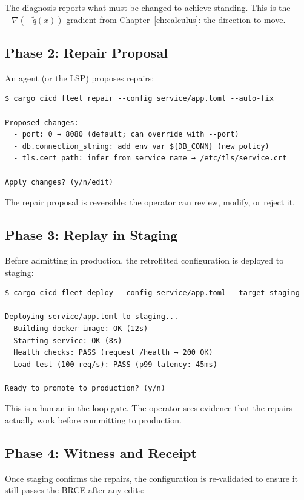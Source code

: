 The diagnosis reports what must be changed to achieve standing. This is the $-\nabla(-\tilde{q}(x))$ gradient from Chapter~\ref{ch:calculus}: the direction to move.

\subsection{Phase 2: Repair Proposal}

An agent (or the LSP) proposes repairs:

\begin{lstlisting}[caption={Repair phase: propose changes}]
$ cargo cicd fleet repair --config service/app.toml --auto-fix

Proposed changes:
  - port: 0 → 8080 (default; can override with --port)
  - db.connection_string: add env var ${DB_CONN} (new policy)
  - tls.cert_path: infer from service name → /etc/tls/service.crt

Apply changes? (y/n/edit)
\end{lstlisting}

The repair proposal is reversible: the operator can review, modify, or reject it.

\subsection{Phase 3: Replay in Staging}

Before admitting in production, the retrofitted configuration is deployed to staging:

\begin{lstlisting}[caption={Staging validation: verify repairs work}]
$ cargo cicd fleet deploy --config service/app.toml --target staging

Deploying service/app.toml to staging...
  Building docker image: OK (12s)
  Starting service: OK (8s)
  Health checks: PASS (request /health → 200 OK)
  Load test (100 req/s): PASS (p99 latency: 45ms)

Ready to promote to production? (y/n)
\end{lstlisting}

This is a human-in-the-loop gate. The operator sees evidence that the repairs actually work before committing to production.

\subsection{Phase 4: Witness and Receipt}

Once staging confirms the repairs, the configuration is re-validated to ensure it still passes the BRCE after any edits:

